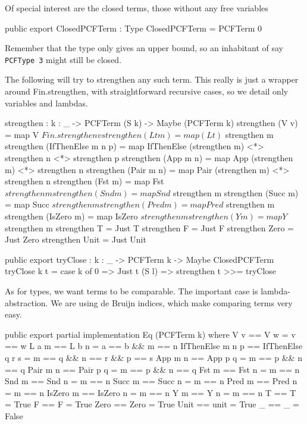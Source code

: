 Of special interest are the closed terms, those without any free variables

\begin{code}
public export
ClosedPCFTerm : Type
ClosedPCFTerm = PCFTerm 0
\end{code}

Remember that the type only gives an upper bound, so an inhabitant of say
\lstinline{PCFType 3} might still be closed.

The following will try to strengthen any such term. This really is just a
wrapper around Fin.strengthen, with straightforward recursive cases,
so we detail only variables and lambdas.

\begin{code}
strengthen : {k : _} -> PCFTerm (S k) -> Maybe (PCFTerm k)
strengthen (V v)              = map V          $ Fin.strengthen v
strengthen (L t m)            = map (L t)      $ strengthen m
strengthen (IfThenElse m n p) = map IfThenElse (strengthen m) <*> strengthen n <*> strengthen p
strengthen (App m n)          = map App        (strengthen m) <*> strengthen n
strengthen (Pair m n)         = map Pair       (strengthen m) <*> strengthen n
strengthen (Fst m)            = map Fst        $ strengthen m
strengthen (Snd m)            = map Snd        $ strengthen m
strengthen (Succ m)           = map Succ       $ strengthen m
strengthen (Pred m)           = map Pred       $ strengthen m
strengthen (IsZero m)         = map IsZero     $ strengthen m
strengthen (Y m)              = map Y          $ strengthen m
strengthen T                  = Just T
strengthen F                  = Just F
strengthen Zero               = Just Zero
strengthen Unit               = Just Unit
\end{code}

\begin{code}
public export
tryClose : {k : _} -> PCFTerm k -> Maybe ClosedPCFTerm
tryClose {k} t = case k of
                 0     => Just t
                 (S l) => strengthen t >>= tryClose
\end{code}

As for types, we want terms to be comparable. The important case is
lambda-abstraction. We are using de Bruijn indices, which make comparing terms
very easy.

\begin{code}
public export partial
implementation Eq (PCFTerm k) where
  V v              == V w              = v == w
  L a m            == L b n            = a == b && m == n
  IfThenElse m n p == IfThenElse q r s = m == q && n == r && p == s
  App m n          == App p q          = m == p && n == q
  Pair m n         == Pair p q         = m == p && n == q
  Fst m            == Fst n            = m == n
  Snd m            == Snd n            = m == n
  Succ m           == Succ n           = m == n
  Pred m           == Pred n           = m == n
  IsZero m         == IsZero n         = m == n
  Y m              == Y n              = m == n
  T                == T                = True
  F                == F                = True
  Zero             == Zero             = True
  Unit             == unit             = True
  _                == _                = False
\end{code}

